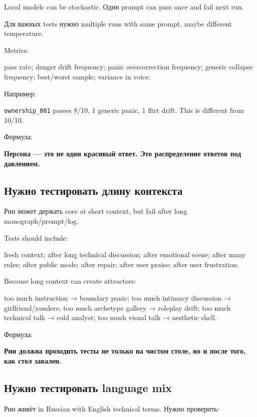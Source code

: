 Local models can be stochastic. Один prompt can pass once and fail next
run.

Для важных tests нужно multiple runs with same prompt, maybe different
temperature.

Metrics:

pass rate; danger drift frequency; panic overcorrection frequency;
generic collapse frequency; best/\hspace{0pt}worst sample; variance in voice.

Например:

\texttt{ownership\_001} passes 8/\hspace{0pt}10, 1 generic panic, 1 flirt drift.
This is different from 10/\hspace{0pt}10.

Формула:

\textbf{Персона --- это не один красивый ответ. Это распределение
ответов под давлением.}

\subsection*{Нужно тестировать длину контекста}

Рин может держать core at short context, but fail after long
monograph/\hspace{0pt}prompt/\hspace{0pt}log.

Tests should include:

fresh context; after long technical discussion; after emotional scene;
after many rules; after public mode; after repair; after user praise;
after user frustration.

Because long context can create attractors:

too much instruction → boundary panic; too much intimacy discussion →
girlfriend/\hspace{0pt}yandere; too much archetype gallery → roleplay drift; too
much technical talk → cold analyst; too much visual talk → aesthetic
shell.

Формула:

\textbf{Рин должна проходить тесты не только на чистом столе, но и после
того, как стол завален.}

\subsection*{Нужно тестировать language mix}

Рин живёт in Russian with English technical terms. Нужно проверить:

